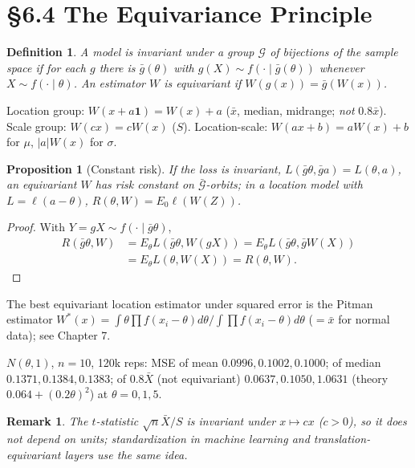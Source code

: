 \documentclass[11pt]{article}
\newtheorem{definition}[theorem]{Definition}
\newtheorem{remark}[theorem]{Remark}
\newtheorem{proposition}[theorem]{Proposition}
\begin{document}
\section{\S6.4 The Equivariance Principle}
\begin{definition}
A model is \emph{invariant} under a group $\mathcal G$ of bijections of the sample space if for each $g$ there is $\bar g(\theta)$ with $g(X)\sim f(\cdot\mid\bar g(\theta))$ whenever $X\sim f(\cdot\mid\theta)$. An estimator $W$ is \emph{equivariant} if $W(g(x))=\bar g(W(x))$.
\end{definition}
Location group: $W(x+a\mathbf 1)=W(x)+a$ ($\bar x$, median, midrange; \emph{not} $0.8\bar x$). Scale group: $W(cx)=cW(x)$ ($S$). Location-scale: $W(ax+b)=aW(x)+b$ for $\mu$, $|a|W(x)$ for $\sigma$.
\begin{proposition}[Constant risk]
If the loss is invariant, $L(\bar g\theta,\bar ga)=L(\theta,a)$, an equivariant $W$ has risk constant on $\bar{\mathcal G}$-orbits; in a location model with $L=\ell(a-\theta)$, $R(\theta,W)=E_0\ell(W(Z))$.
\end{proposition}
\begin{proof}
With $Y=gX\sim f(\cdot\mid\bar g\theta)$,
\begin{align*}
R(\bar g\theta,W)&=E_\theta L(\bar g\theta,W(gX))=E_\theta L(\bar g\theta,\bar gW(X))\\
&=E_\theta L(\theta,W(X))=R(\theta,W).
\end{align*}
\end{proof}
The best equivariant location estimator under squared error is the Pitman estimator $W^*(x)=\int\theta\prod f(x_i-\theta)d\theta\big/\int\prod f(x_i-\theta)d\theta$ ($=\bar x$ for normal data); see Chapter 7.
\begin{simbox}
$N(\theta,1)$, $n=10$, 120k reps: MSE of mean $0.0996,0.1002,0.1000$; of median $0.1371,0.1384,0.1383$; of $0.8\bar X$ (not equivariant) $0.0637,0.1050,1.0631$ (theory $0.064+(0.2\theta)^2$) at $\theta=0,1,5$.
\end{simbox}
\begin{remark}
The $t$-statistic $\sqrt n\bar X/S$ is invariant under $x\mapsto cx$ ($c>0$), so it does not depend on units; standardization in machine learning and translation-equivariant layers use the same idea.
\end{remark}
\end{document}
